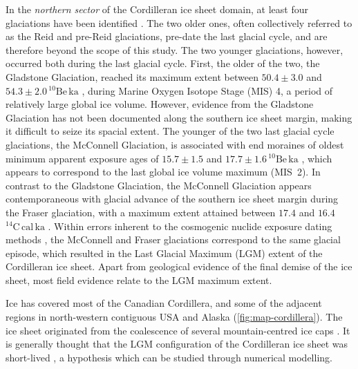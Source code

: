 \documentclass{article}
\newcommand{\unit}[1]{\ensuremath{\mathrm{#1}}}
\begin{document}
In the \emph{northern sector} of the Cordilleran ice sheet domain, at least four glaciations have
been identified
    \citep{Duk-Rodkin.1999, Ward.etal.2007, Ward.etal.2008,
           Briner.Kaufman.2008, Demuro.etal.2012,
           Stroeven.etal.2010, Stroeven.etal.2014}.
The two older ones, often collectively referred to as the Reid  and pre-Reid glaciations,
pre-date the last glacial cycle, and are therefore beyond the scope of this study.
The two younger glaciations, however, occurred both during the last glacial
cycle. First, the older of the two, the Gladstone Glaciation, reached its maximum extent between
$50.4\pm3.0$ and $54.3\pm2.0$\,\unit{^{10}Be\,ka} \citep{Ward.etal.2007},
during Marine Oxygen Isotope Stage (MIS) 4, a period of relatively large global ice volume. However, evidence from the Gladstone Glaciation has not been
documented along the southern ice sheet margin, making it difficult to
seize its spacial extent. The younger of the two last glacial cycle glaciations, the McConnell Glaciation, is associated with end
moraines of oldest minimum apparent exposure ages of
$15.7\pm1.5$ and $17.7\pm1.6$\,\unit{^{10}Be\,ka} \citep{Stroeven.etal.2014},
which appears to correspond to the last global ice volume maximum (MIS~2). In contrast to
the Gladstone Glaciation, the McConnell Glaciation appears contemporaneous with glacial advance of the southern ice sheet margin during the Fraser
glaciation, with a maximum extent attained between
$17.4$ and $16.4$\,\unit{^{14}C\,cal\,ka} \citep{Porter.Swanson.1998}.
Within errors inherent to the cosmogenic nuclide exposure dating methods \citep{Heyman.etal.2011}, the
McConnell and Fraser glaciations correspond to the same glacial episode, which
resulted in the Last Glacial Maximum (LGM) extent of the Cordilleran ice sheet. Apart from geological evidence of the final demise of the ice sheet, most field evidence relate to the LGM maximum extent.

Ice has covered most of the
Canadian Cordillera, and some of the adjacent regions in north-western contiguous
USA and Alaska (\cref{fig:map-cordillera}). The ice sheet originated from the
coalescence of several mountain-centred ice caps \citep{Davis.Mathews.1944}. It is generally thought that the LGM configuration of the Cordilleran ice sheet was short-lived
    \citep{Clague.etal.1980, Clague.1985, Cosma.etal.2008}, a hypothesis which can be studied through numerical modelling.
\end{document}
